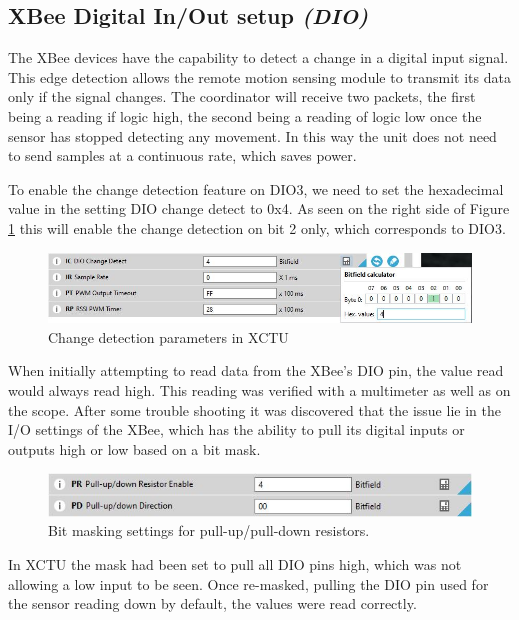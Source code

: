\documentclass[letter,twocolumn]{report}
\begin{document}
	\subsection{XBee Digital In/Out setup \textit{(DIO)}}
	\par The XBee devices have the capability to detect a change in a digital input signal. This edge detection allows the remote motion sensing module to transmit its data only if the signal changes. The coordinator will receive two packets, the first being a reading if logic high, the second being a reading of logic low once the sensor has stopped detecting any movement. In this way the unit does not need to send samples at a continuous rate, which saves power.
	\par To enable the change detection feature on DIO3, we need to set the hexadecimal value in the setting DIO change detect to 0x4. As seen on the right side of Figure \ref{fig:changeDet} this will enable the change detection on bit 2 only, which corresponds to DIO3. 
	\begin{figure}[h]
		\centering
		\includegraphics[width=\linewidth]{changeDetect.JPG}
		\caption{Change detection parameters in XCTU}
		\label{fig:changeDet}
	\end{figure}
	\par When initially attempting to read data from the XBee's DIO pin, the value read would always read high. This reading was verified with a multimeter as well as on the scope. After some trouble shooting it was discovered that the issue lie in the I/O settings of the XBee, which has the ability to pull its digital inputs or outputs high or low based on a bit mask. 
	\begin{figure}[h]
		\centering
		\includegraphics[width=\linewidth]{bitMask.JPG}
		\caption{Bit masking settings for pull-up/pull-down resistors.}
		\label{fig:bitMask}
	\end{figure}
	\par In XCTU the mask had been set to pull all DIO pins high, which was not allowing a low input to be seen. Once re-masked, pulling the DIO pin used for the sensor reading down by default, the values were read correctly.
	
\end{document}
